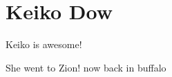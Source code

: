 \documentclass{amsart}
\begin{document}
\section{Keiko Dow}

Keiko is awesome!

She went to Zion! now back in buffalo
\end{document}
